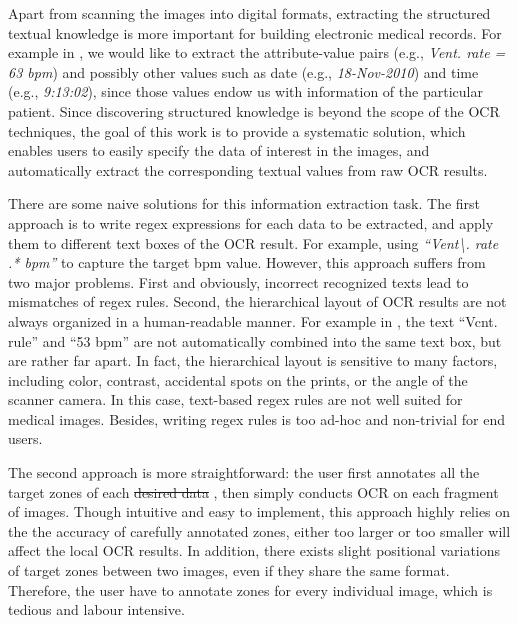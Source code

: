 Apart from scanning the images into digital formats,
extracting the structured textual knowledge is more important for
building electronic medical records.
For example in ,
we would like to extract the attribute-value pairs
(e.g., \textit{Vent. rate = 63 bpm}) and possibly other values such as
date (e.g., \textit{18-Nov-2010}) and time (e.g., \textit{9:13:02}),
since those values endow us with information of the particular patient.
Since discovering structured knowledge is beyond the scope of the OCR techniques,
the goal of this work is to provide a systematic solution,
which enables users to easily specify the data of interest in the images,
and automatically extract the corresponding textual values from raw OCR results.

There are some naive solutions for this information extraction task.
The first approach is to write regex expressions for each data to be extracted,
and apply them to different text boxes of the OCR result.
For example, using \textit{``Vent\textbackslash . rate .* bpm''}
to capture the target bpm value.
However, this approach suffers from two major problems.
First and obviously,
incorrect recognized texts lead to mismatches of regex rules.
Second, the hierarchical layout of OCR results are
not always organized in a human-readable manner.
For example in , the text ``Vcnt. rule'' and ``53 bpm''
are not automatically combined into the same text box, but are rather far apart.
In fact, the hierarchical layout is sensitive to many factors,
including color, contrast, accidental spots on the prints, or the angle of the scanner camera.
In this case, text-based regex rules are not well suited for medical images.
Besides, writing regex rules is too ad-hoc and non-trivial for end users.

The second approach is more straightforward:
the user first annotates all the target zones of each
\st{desired data} ,
then simply conducts OCR on each fragment of images.
Though intuitive and easy to implement,
this approach highly relies on the the accuracy of carefully annotated zones,
either too larger or too smaller will affect the local OCR results.
In addition, there exists slight positional variations of target zones
between two images, even if they share the same format.
Therefore, the user have to annotate zones for every individual image,
which is tedious and labour intensive.

